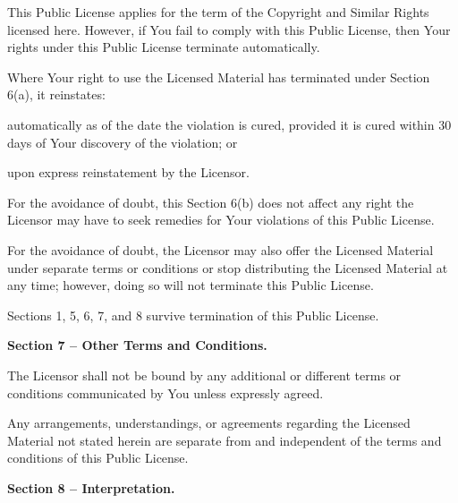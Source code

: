 	\begin{ccEnumerate}
		\item This Public License applies for the term of the Copyright and Similar Rights licensed here. However, if You fail to comply with this Public License, then Your rights under this Public License terminate automatically.
		\item 
		      \par Where Your right to use the Licensed Material has terminated under Section 6(a), it reinstates:
		      \begin{ccEnumerate}
		      	\item automatically as of the date the violation is cured, provided it is cured within 30 days of Your discovery of the violation; or
		      	\item upon express reinstatement by the Licensor.
		      \end{ccEnumerate}
		      For the avoidance of doubt, this Section 6(b) does not affect any right the Licensor may have to seek remedies for Your violations of this Public License.
		\item For the avoidance of doubt, the Licensor may also offer the Licensed Material under separate terms or conditions or stop distributing the Licensed Material at any time; however, doing so will not terminate this Public License.
		\item Sections 1, 5, 6, 7, and 8 survive termination of this Public License.
	\end{ccEnumerate}
	\par \textbf{Section 7 – Other Terms and Conditions.}
	\begin{ccEnumerate}
		\item The Licensor shall not be bound by any additional or different terms or conditions communicated by You unless expressly agreed.
		\item Any arrangements, understandings, or agreements regarding the Licensed Material not stated herein are separate from and independent of the terms and conditions of this Public License.
	\end{ccEnumerate}
	\par \textbf{Section 8 – Interpretation.}
